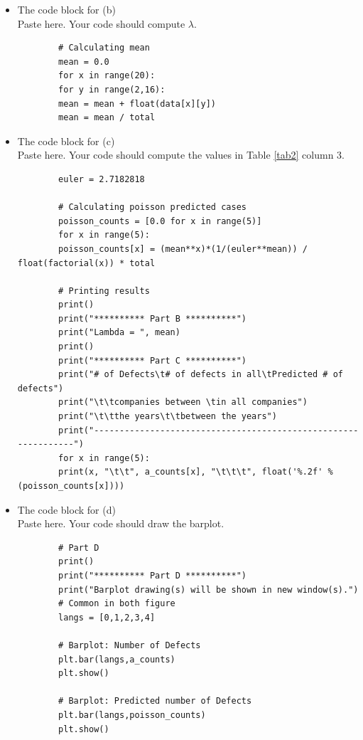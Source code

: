 \documentclass[a4 paper]{article}
\numberwithin{equation}{section}
\newcommand{\0}{\mathbf{0}}
\begin{document}
\begin{itemize}
		
		\item The code block for (b)\\
		Paste here. Your code should compute $\lambda$.
		\lstset{language=Python}
		\lstset{frame=lines}
		\lstset{basicstyle=\footnotesize}
		\begin{lstlisting}
		# Calculating mean
		mean = 0.0
		for x in range(20):
		for y in range(2,16):
		mean = mean + float(data[x][y])
		mean = mean / total
		\end{lstlisting}
		
		\item The code block for (c)\\
		Paste here. Your code should compute the values in Table \ref{tab2} column 3. 
		\lstset{language=Python}
		\lstset{frame=lines}
		\lstset{basicstyle=\footnotesize}
		\begin{lstlisting}
		euler = 2.7182818
		
		# Calculating poisson predicted cases
		poisson_counts = [0.0 for x in range(5)]
		for x in range(5):
		poisson_counts[x] = (mean**x)*(1/(euler**mean)) / float(factorial(x)) * total
		
		# Printing results
		print()
		print("********** Part B **********")
		print("Lambda = ", mean)
		print()
		print("********** Part C **********")
		print("# of Defects\t# of defects in all\tPredicted # of defects")
		print("\t\tcompanies between \tin all companies")
		print("\t\tthe years\t\tbetween the years")
		print("---------------------------------------------------------------")
		for x in range(5):
		print(x, "\t\t", a_counts[x], "\t\t\t", float('%.2f' % (poisson_counts[x])))
		\end{lstlisting}
		
		
		\item The code block for (d)\\
		Paste here. Your code should draw the barplot.
		\lstset{language=Python}
		\lstset{frame=lines}
		\lstset{basicstyle=\footnotesize}
		\begin{lstlisting}
		# Part D
		print()
		print("********** Part D **********")
		print("Barplot drawing(s) will be shown in new window(s).")
		# Common in both figure
		langs = [0,1,2,3,4]
		
		# Barplot: Number of Defects
		plt.bar(langs,a_counts)
		plt.show()
		
		# Barplot: Predicted number of Defects
		plt.bar(langs,poisson_counts)
		plt.show()
		\end{lstlisting}
	\end{itemize}
	
	
	
	
\end{document}

